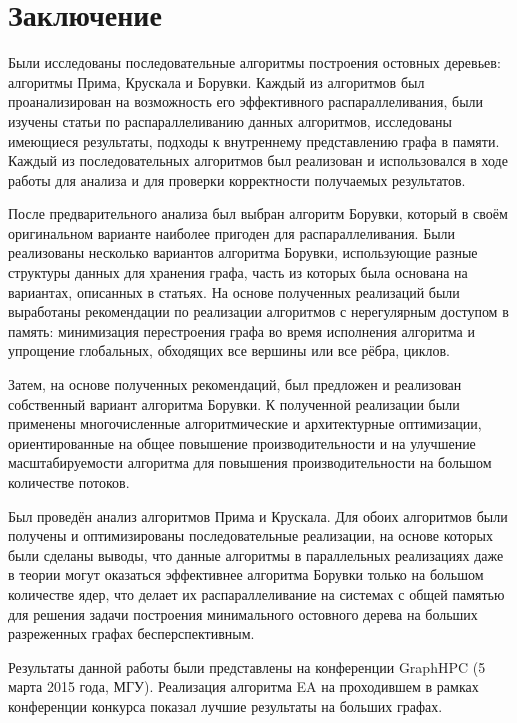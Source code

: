 \documentclass[a4paper,12pt]{extarticle}
\let\stdsection\section
\renewcommand\section{
    \newpage
    \stdsection
}
\begin{document}
\section{Заключение}
\label{sec:conclusion}

Были исследованы последовательные алгоритмы построения остовных деревьев: алгоритмы Прима, Крускала и Борувки. 
Каждый из алгоритмов был проанализирован на возможность его эффективного распараллеливания, были изучены статьи по распараллеливанию данных алгоритмов, исследованы имеющиеся результаты, подходы к внутреннему представлению графа в памяти.
Каждый из последовательных алгоритмов был реализован и использовался в ходе работы для анализа и для проверки корректности получаемых результатов.

После предварительного анализа был выбран алгоритм Борувки, который в своём оригинальном варианте наиболее пригоден для распараллеливания.
Были реализованы несколько вариантов алгоритма Борувки, использующие разные структуры данных для хранения графа, часть из которых была основана на вариантах, описанных в статьях.
На основе полученных реализаций были выработаны рекомендации по реализации алгоритмов с нерегулярным доступом в память: минимизация перестроения графа во время исполнения алгоритма и упрощение глобальных, обходящих все вершины или все рёбра, циклов.

Затем, на основе полученных рекомендаций, был предложен и реализован собственный вариант алгоритма Борувки.
К полученной реализации были применены многочисленные алгоритмические и архитектурные оптимизации, ориентированные на общее повышение производительности и на улучшение масштабируемости алгоритма для повышения производительности на большом количестве потоков.

Был проведён анализ алгоритмов Прима и Крускала.
Для обоих алгоритмов были получены и оптимизированы последовательные реализации, на основе которых были сделаны выводы, что данные алгоритмы в параллельных реализациях даже в теории могут оказаться эффективнее алгоритма Борувки только на большом количестве ядер, что делает их распараллеливание на системах с общей памятью для решения задачи построения минимального остовного дерева на больших разреженных графах бесперспективным.

Результаты данной работы были представлены на конференции GraphHPC (5 марта 2015 года, МГУ).
Реализация алгоритма EA на проходившем в рамках конференции конкурса показал лучшие результаты на больших графах.
\end{document}
